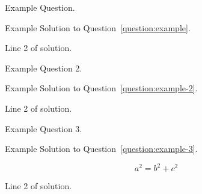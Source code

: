 \begin{question}{50}
  \label{question:example}
  Example Question.
\end{question}

\begin{solution}
  Example Solution to Question~\ref{question:example}.

  Line 2 of solution.
\end{solution}

\begin{question}{50}
  \label{question:example-2}
  Example Question 2.
\end{question}

\begin{solution}
  Example Solution to Question~\ref{question:example-2}.

  Line 2 of solution.
\end{solution}


\newpage


\begin{question}{50}
  \label{question:example-3}
  Example Question 3.
\end{question}

\begin{solution}
  Example Solution to Question~\ref{question:example-3}.

  \[ a^{2} = b^{2} + c^{2}\]

  Line 2 of solution.
\end{solution}
